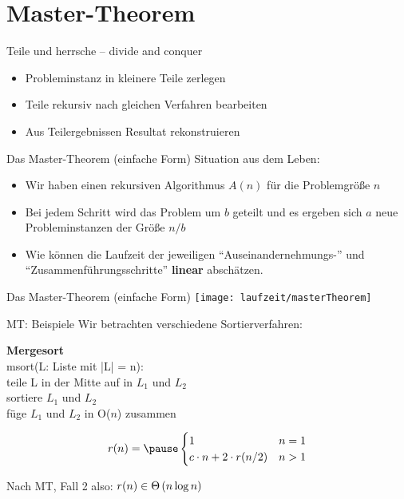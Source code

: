 \section{Master-Theorem}

\begin{frame}{Teile und herrsche -- divide and conquer}
	\begin{itemize}
		\item Probleminstanz in kleinere Teile zerlegen
		\item Teile rekursiv nach gleichen Verfahren bearbeiten
		\item Aus Teilergebnissen Resultat rekonstruieren
	\end{itemize}
\end{frame}

\begin{frame}{Das Master-Theorem (einfache Form)}
	Situation aus dem Leben: 
	\begin{itemize}[<+->]
		\item Wir haben einen rekursiven Algorithmus $A(n)$ für die Problemgröße $n$
		\item Bei jedem Schritt wird das Problem um $b$ geteilt und es ergeben sich $a$ neue Probleminstanzen der Größe $n/b$
		\item Wie können die Laufzeit der jeweiligen \enquote{Auseinandernehmungs-} und \enquote{Zusammenführungsschritte} \textbf{linear} abschätzen.
	\end{itemize}
\end{frame}

\begin{frame}{Das Master-Theorem (einfache Form)}
	\texttt{[image: laufzeit/masterTheorem]}
\end{frame}

\begin{frame}{MT: Beispiele}
	Wir betrachten verschiedene Sortierverfahren:\\
	\bigskip
	
	\textbf{Mergesort}\\
	msort(L: Liste mit |L| = n):\\
		teile L in der Mitte auf in $L_1$ und $L_2$\\
		sortiere $L_1$ und $L_2$\\
		füge $L_1$ und $L_2$ in O($n$) zusammen\\
	\medskip
	
	$$r(n) = \pause \begin{cases}
	1 & n = 1\\
	c \cdot n + 2 \cdot r(n/2) & n > 1
	\end{cases}$$
	
	\pause
	Nach MT, Fall 2 also: $r(n) \in \Theta\left(n \log n\right)$
\end{frame}

